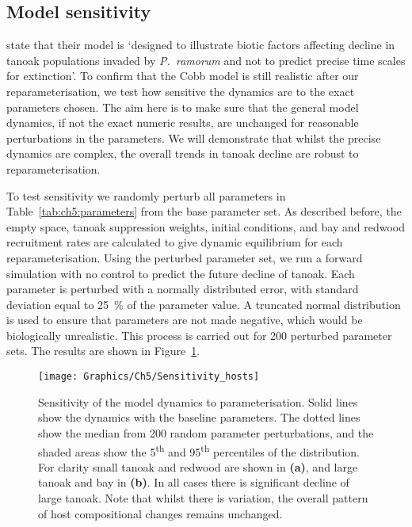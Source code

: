 \FloatBarrier
\subsection{Model sensitivity\label{sec:ch5:model_sensitivity}}

\citet{cobb_ecosystem_2012} state that their model is `designed to illustrate biotic factors affecting decline in tanoak populations invaded by \emph{P.~ramorum} and not to predict precise time scales for extinction'. To confirm that the Cobb model is still realistic after our reparameterisation, we test how sensitive the dynamics are to the exact parameters chosen. The aim here is to make sure that the general model dynamics, if not the exact numeric results, are unchanged for reasonable perturbations in the parameters. We will demonstrate that whilst the precise dynamics are complex, the overall trends in tanoak decline are robust to reparameterisation.

To test sensitivity we randomly perturb all parameters in Table~\ref{tab:ch5:parameters} from the base parameter set. As described before, the empty space, tanoak suppression weights, initial conditions, and bay and redwood recruitment rates are calculated to give dynamic equilibrium for each reparameterisation. Using the perturbed parameter set, we run a forward simulation with no control to predict the future decline of tanoak. Each parameter is perturbed with a normally distributed error, with standard deviation equal to \SI{25}{\percent} of the parameter value. A truncated normal distribution is used to ensure that parameters are not made negative, which would be biologically unrealistic. This process is carried out for 200 perturbed parameter sets. The results are shown in Figure~\ref{fig:ch5:model_sensitivity}.

\begin{figure}[H]
    \begin{center}
        \texttt{[image: Graphics/Ch5/Sensitivity\_hosts]}
        \caption[Sensitivity of model dynamics]{Sensitivity of the model dynamics to parameterisation. Solid lines show the dynamics with the baseline parameters. The dotted lines show the median from 200 random parameter perturbations, and the shaded areas show the 5\textsuperscript{th} and 95\textsuperscript{th} percentiles of the distribution. For clarity small tanoak and redwood are shown in \textbf{(a)}, and large tanoak and bay in \textbf{(b)}. In all cases there is significant decline of large tanoak. Note that whilst there is variation, the overall pattern of host compositional changes remains unchanged.\label{fig:ch5:model_sensitivity}}
    \end{center}
\end{figure}


